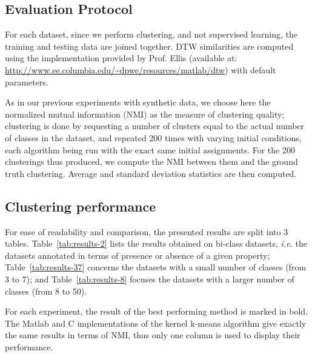 \documentclass[10pt,letterpaper]{article}
\begin{document}
\subsection{Evaluation Protocol}

For each dataset, since we perform clustering, and not supervised learning, the training and testing data are joined together. DTW similarities are computed using the implementation provided by Prof. Ellis (available at: \url{http://www.ee.columbia.edu/~dpwe/resources/matlab/dtw}) with default parameters.

As in our previous experiments with synthetic data, we choose here the normalized mutual information (NMI) as the measure of clustering quality; clustering is done by requesting a number of clusters equal to the actual number of classes in the dataset, and repeated 200 times with varying initial conditions, each algorithm being run with the exact same initial assignments. For the 200 clusterings thus produced, we compute the NMI between them and the ground truth clustering. Average and standard deviation statistics are then computed.

\subsection{Clustering performance}


For ease of readability and comparison, the presented results are split into 3 tables. Table~\ref{tab:results-2} lists the results obtained on bi-class datasets, \textit{i.e.} the datasets annotated in terms of presence or absence of a given property; Table~\ref{tab:results-37} concerns the datasets with a small number of classes (from 3 to 7); and Table~\ref{tab:results-8} focuses the datasets with a larger number of classes (from 8 to 50).

For each experiment, the result of the best performing method is marked in bold. The Matlab and C implementations of the kernel k-means algorithm give exactly the same results in terms of NMI, thus only one column is used to display their performance.
\end{document}

